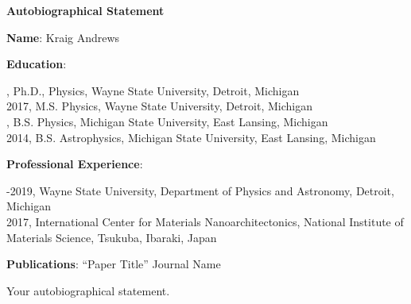 

\begin{center}

\textbf{Autobiographical Statement}
\end{center}
\noindent
\textbf{Name}:
\noindent
Kraig Andrews
\singlespacing

\noindent
\textbf{Education}:


, Ph.D., Physics, Wayne State University, Detroit, Michigan\\
2017, M.S. Physics, Wayne State University, Detroit, Michigan\\

, B.S. Physics, Michigan State University, East Lansing, Michigan\\
2014, B.S. Astrophysics, Michigan State University, East Lansing, Michigan

\noindent
\textbf{Professional Experience}:

-2019, Wayne State University, Department of Physics and Astronomy, Detroit, Michigan\\
2017, International Center for Materials Nanoarchitectonics, National Institute of Materials Science, Tsukuba, Ibaraki, Japan

\noindent
\textbf{Publications}: ``Paper Title'' Journal Name

\doublespacing

\singlespacing
Your autobiographical statement.
